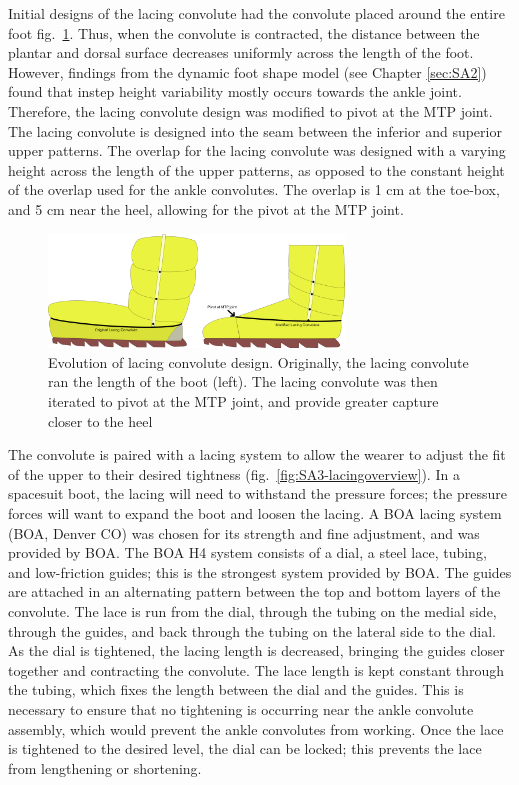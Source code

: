 \documentclass[defaultstyle,11pt]{comps}
\begin{document}
Initial designs of the lacing convolute had the convolute placed around the entire foot fig.~\ref{fig:SA3-lacingevo}.
Thus, when the convolute is contracted, the distance between the plantar and dorsal surface decreases uniformly across the length of the foot.
However, findings from the dynamic foot shape model (see Chapter \ref{sec:SA2}) found that instep height variability mostly occurs towards the ankle joint.
Therefore, the lacing convolute design was modified to pivot at the MTP joint.
The lacing convolute is designed into the seam between the inferior and superior upper patterns.
The overlap for the lacing convolute was designed with a varying height across the length of the upper patterns, as opposed to the constant height of the overlap used for the ankle convolutes.
The overlap is 1 cm at the toe-box, and 5 cm near the heel, allowing for the pivot at the MTP joint.

\begin{figure}
\hypertarget{fig:SA3-lacingevo}{%
\centering
\includegraphics[width=0.7\textwidth,height=\textheight]{../fig/SA3/LacingConvolute_evolution.png}
\caption{Evolution of lacing convolute design. Originally, the lacing convolute ran the length of the boot (left). The lacing convolute was then iterated to pivot at the MTP joint, and provide greater capture closer to the heel}\label{fig:SA3-lacingevo}
}
\end{figure}

The convolute is paired with a lacing system to allow the wearer to adjust the fit of the upper to their desired tightness (fig.~\ref{fig:SA3-lacingoverview}).
In a spacesuit boot, the lacing will need to withstand the pressure forces; the pressure forces will want to expand the boot and loosen the lacing.
A BOA lacing system (BOA, Denver CO) was chosen for its strength and fine adjustment, and was provided by BOA.
The BOA H4 system consists of a dial, a steel lace, tubing, and low-friction guides; this is the strongest system provided by BOA.
The guides are attached in an alternating pattern between the top and bottom layers of the convolute.
The lace is run from the dial, through the tubing on the medial side, through the guides, and back through the tubing on the lateral side to the dial.
As the dial is tightened, the lacing length is decreased, bringing the guides closer together and contracting the convolute.
The lace length is kept constant through the tubing, which fixes the length between the dial and the guides.
This is necessary to ensure that no tightening is occurring near the ankle convolute assembly, which would prevent the ankle convolutes from working.
Once the lace is tightened to the desired level, the dial can be locked; this prevents the lace from lengthening or shortening.
\end{document}
